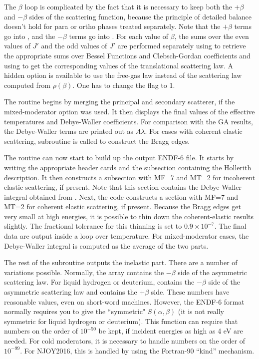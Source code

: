 The $\beta$ loop is complicated by the fact that it is necessary to keep
both the $+\beta$ and $-\beta$ sides of the scattering function, because
the principle of detailed balance doesn't hold for para or ortho phases
treated separately.  Note that the $+\beta$ terms go into ,
and the $-\beta$ terms go into .  For each value of $\beta$,
the sums over the even values of $J'$ and the odd values of $J'$ are
performed separately using  to retrieve the appropriate sums
over Bessel Functions and Clebsch-Gordan coefficients and using
 to get the corresponding values of the translational
scattering law.  A hidden option is available to use the free-gas law
instead of the scattering law computed from $\rho(\beta)$.  One has to
change the flag  to 1.

The 
routine begins by merging the principal and secondary
scatterer, if the mixed-moderator option was used.  It then
displays the final values of the effective temperatures and Debye-Waller
coefficients.  For comparison with the GA results, the Debye-Waller
terms are printed out as $A\lambda$.  For cases with coherent elastic
scattering, subroutine 
is called to construct the Bragg edges.

The routine can now start to build up the output ENDF-6 file.  It starts
by writing the appropriate header cards and the subsection containing
the Hollerith description.  It then constructs a subsection with MF=7
and MT=2 for incoherent elastic scattering, if present.  Note that this
section contains the Debye-Waller integral obtained from .
Next, the code constructs a section with MF=7 and MT=2 for coherent
elastic scattering, if present.  Because the Bragg edges get very small
at high energies, it is possible to thin down the coherent-elastic
results slightly.  The fractional tolerance for this thinning
is set to $0.9\times 10^{-7}$.  The final data are output inside a loop
over temperature.  For mixed-moderator cases, the Debye-Waller integral
is computed as the average of the two parts.

The rest of the subroutine outputs the inelastic part.  There are
a number of variations possible.  Normally, the array 
contains the $-\beta$ side of the asymmetric scattering law.  For
liquid hydrogen or deuterium,  contains the $-\beta$ side
of the asymmetric scattering law and  contains the $+\beta$
side.  These numbers have reasonable values, even on short-word machines.
However, the ENDF-6 format normally requires you to give the
``symmetric" $S(\alpha,\beta)$ (it is not really symmetric for
liquid hydrogen or deuterium).  This function can require that numbers
on the order of $10^{-50}$ be kept, if incident energies as high as 4 eV
are needed.  For cold moderators, it is necessary to handle numbers on
the order of $10^{-99}$.  For NJOY2016, this is handled by using the
Fortran-90 ``kind'' mechanism.

